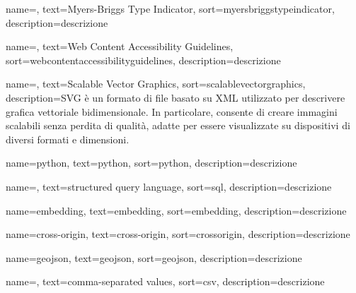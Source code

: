  {
    name=,
    text=Myers-Briggs Type Indicator,
    sort=myersbriggstypeindicator,
    description={descrizione}
}

 {
    name=,
    text=Web Content Accessibility Guidelines,
    sort=webcontentaccessibilityguidelines,
    description={descrizione}
}

 {
    name=,
    text=Scalable Vector Graphics,
    sort=scalablevectorgraphics,
    description={SVG è un formato di file basato su XML utilizzato per descrivere grafica vettoriale bidimensionale. In particolare, consente di creare immagini scalabili senza perdita di qualità, adatte per essere visualizzate su dispositivi di diversi formati e dimensioni.}
}

 {
    name=python,
    text=python,
    sort=python,
    description={descrizione}
}

 {
    name=,
    text=structured query language,
    sort=sql,
    description={descrizione}
}

 {
    name=embedding,
    text=embedding,
    sort=embedding,
    description={descrizione}
}

 {
    name=cross-origin,
    text=cross-origin,
    sort=crossorigin,
    description={descrizione}
}

 {
    name=geojson,
    text=geojson,
    sort=geojson,
    description={descrizione}
}

 {
    name=,
    text=comma-separated values,
    sort=csv,
    description={descrizione}
}



